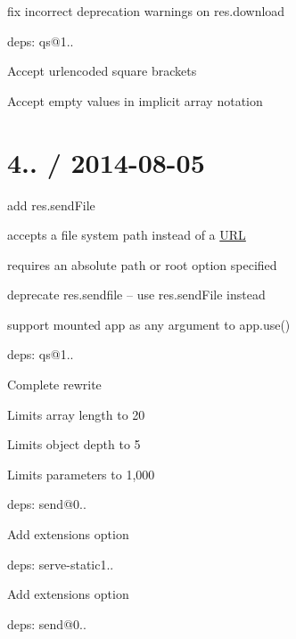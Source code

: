 \begin{DoxyItemize}
\item fix incorrect deprecation warnings on {\ttfamily res.\+download}
\item deps\+: qs@1..
\begin{DoxyItemize}
\item Accept urlencoded square brackets
\item Accept empty values in implicit array notation
\end{DoxyItemize}
\end{DoxyItemize}

\section*{4.. / 2014-\/08-\/05 }


\begin{DoxyItemize}
\item add {\ttfamily res.\+send\+File}
\begin{DoxyItemize}
\item accepts a file system path instead of a \hyperlink{struct_u_r_l}{U\+R\+L}
\item requires an absolute path or {\ttfamily root} option specified
\end{DoxyItemize}
\item deprecate {\ttfamily res.\+sendfile} -- use {\ttfamily res.\+send\+File} instead
\item support mounted app as any argument to {\ttfamily app.\+use()}
\item deps\+: qs@1..
\begin{DoxyItemize}
\item Complete rewrite
\item Limits array length to 20
\item Limits object depth to 5
\item Limits parameters to 1,000
\end{DoxyItemize}
\item deps\+: send@0..
\begin{DoxyItemize}
\item Add {\ttfamily extensions} option
\end{DoxyItemize}
\item deps\+: serve-\/static1..
\begin{DoxyItemize}
\item Add {\ttfamily extensions} option
\item deps\+: send@0..
\end{DoxyItemize}
\end{DoxyItemize}

